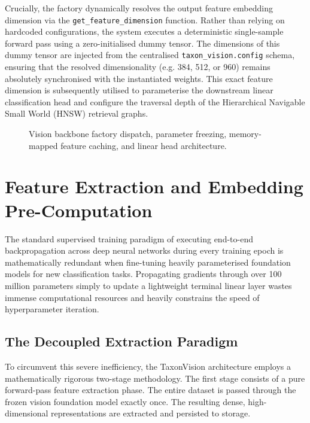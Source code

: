 Crucially, the factory dynamically resolves the output feature embedding dimension via the \texttt{get\_feature\_dimension} function. Rather than relying on hardcoded configurations, the system executes a deterministic single-sample forward pass using a zero-initialised dummy tensor. The dimensions of this dummy tensor are injected from the centralised \texttt{taxon\_vision.config} schema, ensuring that the resolved dimensionality (e.g. 384, 512, or 960) remains absolutely synchronised with the instantiated weights. This exact feature dimension is subsequently utilised to parameterise the downstream linear classification head and configure the traversal depth of the Hierarchical Navigable Small World (HNSW) retrieval graphs.

\begin{figure}[htbp]
\centering

\caption{Vision backbone factory dispatch, parameter freezing, memory-mapped feature caching, and linear head architecture.}
\label{fig:vision_backbone_and_feature_caching}
\end{figure}

\section{Feature Extraction and Embedding Pre-Computation}
\label{sec:feature_extraction_precomputation}

The standard supervised training paradigm of executing end-to-end backpropagation across deep neural networks during every training epoch is mathematically redundant when fine-tuning heavily parameterised foundation models for new classification tasks. Propagating gradients through over 100 million parameters simply to update a lightweight terminal linear layer wastes immense computational resources and heavily constrains the speed of hyperparameter iteration.

\subsection{The Decoupled Extraction Paradigm}

To circumvent this severe inefficiency, the TaxonVision architecture employs a mathematically rigorous two-stage methodology. The first stage consists of a pure forward-pass feature extraction phase. The entire dataset is passed through the frozen vision foundation model exactly once. The resulting dense, high-dimensional representations are extracted and persisted to storage.

